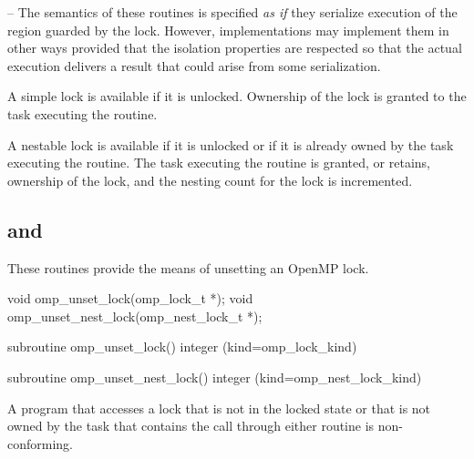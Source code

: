
\notestart \noteheader – The semantics of these routines is specified
\emph{as if} they serialize execution of the region guarded by the
lock. However, implementations may implement them in other ways
provided that the isolation properties are respected so that the
actual execution delivers a result that could arise from some
serialization. 
\noteend

A simple lock is available if it is unlocked. Ownership of the lock is 
granted to the task executing the routine.

A nestable lock is available if it is unlocked or if it is already owned by 
the task executing the routine. The task executing the routine is granted, 
or retains, ownership of the lock, and the nesting count for the lock is 
incremented.




\subsection{ and }
\label{subsec:omp_unset_lock and omp_unset_nest_lock}
\summary
These routines provide the means of unsetting an OpenMP lock.

\format
\ccppspecificstart
\begin{boxedcode}
void omp\_unset\_lock(omp\_lock\_t *);
void omp\_unset\_nest\_lock(omp\_nest\_lock\_t *);
\end{boxedcode}
\ccppspecificend

\fortranspecificstart
\begin{boxedcode}
subroutine omp\_unset\_lock()
integer (kind=omp\_lock\_kind) 

subroutine omp\_unset\_nest\_lock()
integer (kind=omp\_nest\_lock\_kind) 
\end{boxedcode}
\fortranspecificend

\constraints
A program that accesses a lock that is not in the locked state or that is 
not owned by the task that contains the call through either routine is 
non-conforming.

